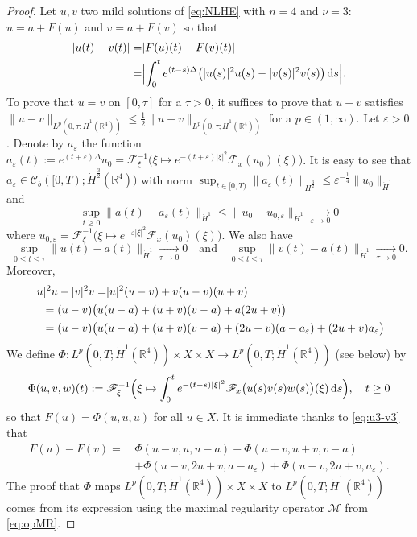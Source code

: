 \documentclass[a4paper, 12pt]{article}
\theoremstyle{plain}
\theoremstyle{definition}
\theoremstyle{remark}
\numberwithin{equation}{section}
\begin{document}
\begin{proof}
Let $u,v$ two mild solutions of \eqref{eq:NLHE} with $n=4$ and $\nu=3$: $u=a+F(u)$ and $v=a+F(v)$ so that
%
\begin{align*}
|u(t)-v(t)|=&|F(u)(t)-F(v)(t)|\\
=&\Bigl|\int_0^te^{(t-s)\Delta}\bigl(|u(s)|^2u(s)-|v(s)|^2v(s)\bigr) \,{\rm d}s\Bigr|.
\end{align*}
%
To prove that $u=v$ on $[0,\tau]$ for a $\tau >0$, it suffices to prove that $u-v$ satisfies 
$\|u-v\|_{L^p(0,\tau;\dot H^1({\mathds{R}}^4))}\le \frac{1}{2}\|u-v\|_{L^p(0,\tau;\dot H^1({\mathds{R}}^4))}$ for a $p\in(1,\infty)$.
Let $\varepsilon>0$. Denote by $a_\varepsilon$ the function 
$a_\varepsilon(t):=e^{(t+\varepsilon)\Delta}u_0={\mathscr{F}}^{-1}_\xi\bigl(\xi\mapsto e^{-(t+\varepsilon) |\xi|^2}{\mathscr{F}}_x(u_0)(\xi)\bigr)$.
It is easy to see that $a_\varepsilon\in {\mathscr{C}}_b([0,T);\dot H^{\frac{3}{2}}({\mathds{R}}^4))$ with norm
$\sup_{t\in[0,T)}\|a_\varepsilon(t)\|_{\dot H^{\frac{3}{2}}}\le \varepsilon^{-\frac{1}{4}}\|u_0\|_{\dot H^1}$ and
\[
\sup_{t\ge 0}\|a(t)-a_\varepsilon(t)\|_{\dot H^1}\le \|u_0-u_{0,\varepsilon}\|_{\dot H^1}\xrightarrow[\varepsilon\to 0]{}0
\] 
where $u_{0,\varepsilon}={\mathscr{F}}^{-1}_\xi\bigl(\xi\mapsto e^{-\varepsilon |\xi|^2}{\mathscr{F}}_x(u_0)(\xi)\bigr)$.
We also have
\[
\sup_{0\le t\le \tau}\|u(t)-a(t)\|_{\dot H^1}\xrightarrow[\tau\to 0]{}0\quad \mbox{and}\quad 
\sup_{0\le t\le \tau}\|v(t)-a(t)\|_{\dot H^1}\xrightarrow[\tau\to 0]{}0.
\] 
Moreover,
%
\begin{align}
|u|^2u-|v|^2v=&|u|^2(u-v) +v (u-v)(u+v)\nonumber\\
&\hspace*{-2cm}=(u-v)\bigl(u(u-a)+(u+v)(v-a)+a(2u+v)\bigr)\nonumber\\
&\hspace*{-2cm}=(u-v)\bigl(u(u-a)+(u+v)(v-a)+(2u+v)(a-a_\varepsilon)+(2u+v)a_\varepsilon\bigr) \label{eq:u3-v3}
\end{align}
%
We define $\Phi:L^p(0,T;\dot H^1({\mathds{R}}^4))\times X\times X\to L^p(0,T;\dot H^1({\mathds{R}}^4))$ (see below) by
\[
\Phi(u,v,w)(t) := {\mathscr{F}}_\xi^{-1}\Bigl(\xi\mapsto \int_0^te^{-(t-s)|\xi|^2}{\mathscr{F}}_x\bigl(u(s)v(s)w(s)\bigr)(\xi) \,{\rm d}s\Bigr),
\quad t\ge0
\]
so that $F(u)=\Phi(u,u,u)$ for all $u\in X$. It is immediate thanks to \eqref{eq:u3-v3} that
%
\begin{align}
F(u)-F(v) = \,&\Phi(u-v,u,u-a)+\Phi(u-v,u+v,v-a) \nonumber\\
&+\Phi(u-v,2u+v,a-a_\varepsilon)+\Phi(u-v, 2u+v, a_\varepsilon). \label{eq:F(u)-F(v)}
\end{align}
%
The proof that $\Phi$ maps $L^p(0,T;\dot H^1({\mathds{R}}^4))\times X\times X$ to $L^p(0,T;\dot H^1({\mathds{R}}^4))$ comes
from its expression using the maximal regularity operator ${\mathscr{M}}$ from \eqref{eq:opMR}. 
  

\end{proof}
\end{document}
